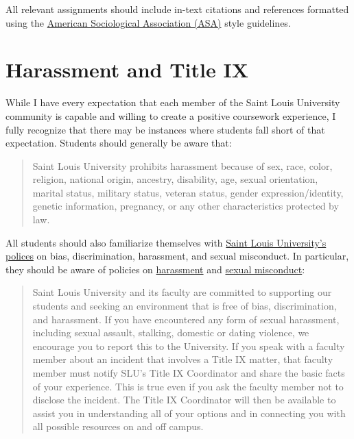 \documentclass[
]{book}
\begin{document}
All relevant assignments should include in-text citations and references formatted using the \href{https://owl.english.purdue.edu/owl/resource/583/1/}{American Sociological Association (ASA)} style guidelines.

\hypertarget{harassment-and-title-ix}{%
\section{Harassment and Title IX}\label{harassment-and-title-ix}}

While I have every expectation that each member of the Saint Louis University community is capable and willing to create a positive coursework experience, I fully recognize that there may be instances where students fall short of that expectation. Students should generally be aware that:

\begin{quote}
Saint Louis University prohibits harassment because of sex, race, color, religion, national origin, ancestry, disability, age, sexual orientation, marital status, military status, veteran status, gender expression/identity, genetic information, pregnancy, or any other characteristics protected by law.
\end{quote}

All students should also familiarize themselves with \href{http://www.slu.edu/general-counsel/institutional-equity-diversity/}{Saint Louis University's polices} on bias, discrimination, harassment, and sexual misconduct. In particular, they should be aware of policies on \href{http://www.slu.edu/general-counsel/institutional-equity-diversity/harassment.php}{harassment} and \href{https://www.slu.edu/about/safety/sexual-assault-resources.php}{sexual misconduct}:

\begin{quote}
Saint Louis University and its faculty are committed to supporting our students and seeking an environment that is free of bias, discrimination, and harassment. If you have encountered any form of sexual harassment, including sexual assault, stalking, domestic or dating violence, we encourage you to report this to the University. If you speak with a faculty member about an incident that involves a Title IX matter, that faculty member must notify SLU's Title IX Coordinator and share the basic facts of your experience. This is true even if you ask the faculty member not to disclose the incident. The Title IX Coordinator will then be available to assist you in understanding all of your options and in connecting you with all possible resources on and off campus.
\end{quote}
\end{document}
